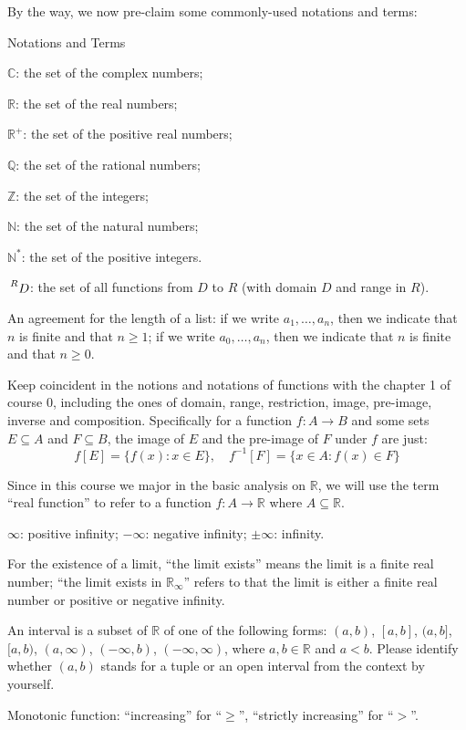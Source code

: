 \documentclass{article}
\begin{document}
By the way, we now pre-claim some commonly-used notations and terms:
\begin{Df}{Notations and Terms}
    \begin{compactenum}
    \item $\mathbb{C}$: the set of the complex numbers;
    \item $\mathbb{R}$: the set of the real numbers;
    \item $\mathbb{R}^+$: the set of the positive real numbers;
    \item $\mathbb{Q}$: the set of the rational numbers;
    \item $\mathbb{Z}$: the set of the integers;
    \item $\mathbb{N}$: the set of the natural numbers;
    \item $\mathbb{N^\ast}$: the set of the positive integers.
    \item $\sideset{^R}{}{\mathop{D}}$: the set of all functions from $D$ to $R$ (with domain $D$ and range in $R$).
    \item An agreement for the length of a list: if we write $a_1, \dots, a_n$, then we indicate that $n$ is finite and that $n\geq 1$; if we write $a_0, \dots, a_n$, then we indicate that $n$ is finite and that $n\geq 0$.
    \item Keep coincident in the notions and notations of functions with the chapter 1 of course 0, including the ones of domain, range, restriction, image, pre-image, inverse and composition. Specifically for a function $f: A\rightarrow B$ and some sets $E\subseteq A$ and $F\subseteq B$, the image of $E$ and the pre-image of $F$ under $f$ are just:
    $$f[E] = \{f(x): x\in E\},\quad f^{-1}[F] = \{x\in A: f(x)\in F\}$$
    \item Since in this course we major in the basic analysis on $\mathbb{R}$, we will use the term ``real function'' to refer to a function $f: A\rightarrow \mathbb{R}$ where $A\subseteq \mathbb{R}$.
    \item $\infty$: positive infinity; $-\infty$: negative infinity; $\pm\infty$: infinity.
    \item For the existence of a limit, ``the limit exists'' means the limit is a finite real number; ``the limit exists in $\mathbb{R}_\infty$'' refers to that the limit is either a finite real number or positive or negative infinity.
    \item An interval is a subset of $\mathbb{R}$ of one of the following forms: $(a,b)$, $[a,b]$, $(a,b]$, $[a,b)$, $(a, \infty)$, $(-\infty, b)$, $(-\infty, \infty)$, where $a, b\in\mathbb{R}$ and $a<b$. Please identify whether $(a,b)$ stands for a tuple or an open interval from the context by yourself.
    \item Monotonic function: ``increasing'' for ``$\geq$'', ``strictly increasing'' for ``$>$''.
\end{compactenum} 
\end{Df}
\end{document}
